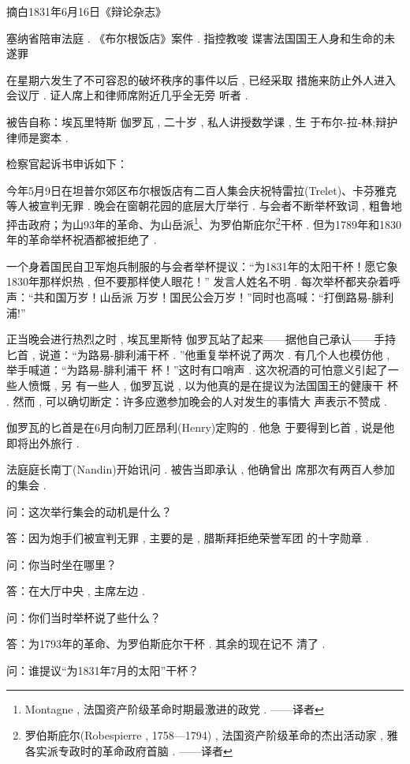 \begin{center}
	摘白1831年6月16日《辩论杂志》

塞纳省陪审法庭 . 《布尔根饭店》案件 . 指控教唆 谍害法国国王人身和生命的未遂罪
\end{center}

在星期六发生了不可容忍的破坏秩序的事件以后 , 已经采取 措施来防止外人进入会议厅 . 证人席上和律师席附近几乎全无旁 听者 . 

被告自称：埃瓦里特斯 \textbullet 伽罗瓦 , 二十岁 , 私人讲授数学课 , 生 于布尔-拉-林;辩护律师是窦本 . 

检察官起诉书申诉如下：

今年5月9日在坦普尔郊区布尔根饭店有二百人集会庆祝特雷拉(Trelet)、卡芬雅克等人被宣判无罪 . 晚会在窗朝花园的底层大厅举行 . 与会者不断举杯致词 , 粗鲁地抨击政府；为山93年的革命、为山岳派\footnote{Montagne , 法国资产阶级革命时期最激进的政党 . ——译者}、为罗伯斯庇尔\footnote{罗伯斯庇尔(Robespierre , 1758—1794) , 法国资产阶级革命的杰出活动家 , 雅各实派专政时的革命政府首脑 . ——译者}干杯 . 但为1789年和1830 年的革命举杯祝酒都被拒绝了 . 

一个身着国民自卫军炮兵制服的与会者举杯提议：“为1831年的太阳干杯！愿它象1830年那样炽热 , 但不要那样使人眼花！” 发言人姓名不明 . 每次举杯都夹杂着呼声：“共和国万岁！山岳派 万岁！国民公会万岁！”同时也高喊：“打倒路易-腓利浦!”

正当晚会进行热烈之时 , 埃瓦里斯特 \textbullet 伽罗瓦站了起来——据他自己承认——手持匕首 , 说道：“为路易-腓利浦干杯 . ”他重复举杯说了两次 . 有几个人也模仿他 , 举手喊道：“为路易-腓利浦干 杯！”这时有口哨声 . 这次祝酒的可怕意义引起了一些人愤慨 , 另 有一些人 , 伽罗瓦说 , 以为他真的是在提议为法国国王的健康干 杯 . 然而 , 可以确切断定：许多应邀参加晚会的人对发生的事情大 声表示不赞成 . 

伽罗瓦的匕首是在6月向制刀匠昂利(Henry)定购的 . 他急 于要得到匕首 , 说是他即将出外旅行 . 

法庭庭长南丁(Nandin)开始讯问 . 被告当即承认 , 他确曾出 席那次有两百人参加的集会 . 

问：这次举行集会的动机是什么？

答：因为炮手们被宣判无罪 , 主要的是 , 腊斯拜拒绝荣誉军团 的十字勋章 . 

问：你当时坐在哪里？

答：在大厅中央 , 主席左边 . 

问：你们当时举杯说了些什么？

答：为1793年的革命、为罗伯斯庇尔干杯 . 其余的现在记不 清了 . 

问：谁提议“为1831年7月的太阳”干杯？

